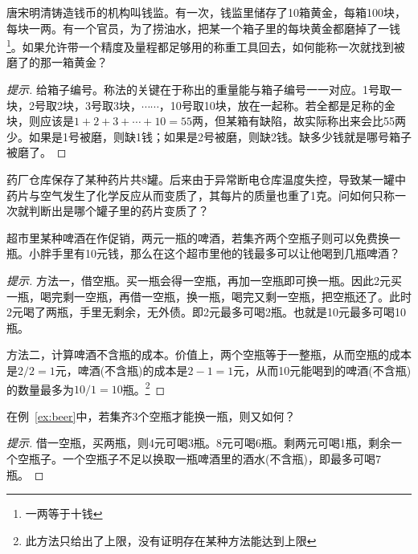 \begin{example}
\renewcommand{\thefootnote}{\fnsymbol{footnote}}%
  唐宋明清铸造钱币的机构叫钱监。有一次，钱监里储存了10箱黄金，每箱100块，每块一两。有一个官员，为了捞油水，把某一个箱子里的每块黄金都磨掉了一钱\footnote{一两等于十钱}。如果允许带一个精度及量程都足够用的称重工具回去，如何能称一次就找到被磨了的那一箱黄金？
\end{example}
\begin{proof}[提示]\let\qed\relax%
  给箱子编号。称法的关键在于称出的重量能与箱子编号一一对应。1号取一块，2号取2块，3号取3块，$\cdots\cdots$，10号取10块，放在一起称。若全都是足称的金块，则应该是$1+2+3+\cdots+10=55$两，但某箱有缺陷，故实际称出来会比55两少。如果是1号被磨，则缺1钱；如果是2号被磨，则缺2钱。缺多少钱就是哪号箱子被磨了。
\end{proof}

\begin{question}
  药厂仓库保存了某种药片共8罐。后来由于异常断电仓库温度失控，导致某一罐中药片与空气发生了化学反应从而变质了，其每片的质量也重了1克。问如何只称一次就判断出是哪个罐子里的药片变质了？
\end{question}

\begin{example}[空瓶换酒]\label{ex:beer}
  超市里某种啤酒在作促销，两元一瓶的啤酒，若集齐两个空瓶子则可以免费换一瓶。小胖手里有10元钱，那么在这个超市里他的钱最多可以让他喝到几瓶啤酒？
\end{example}
\begin{proof}[提示]\renewcommand{\thefootnote}{\fnsymbol{footnote}}%
  方法一，借空瓶。买一瓶会得一空瓶，再加一空瓶即可换一瓶。因此2元买一瓶，喝完剩一空瓶，再借一空瓶，换一瓶，喝完又剩一空瓶，把空瓶还了。此时2元喝了两瓶，手里无剩余，无外债。即2元最多可喝2瓶。也就是10元最多可喝10瓶。

  方法二，计算啤酒不含瓶的成本。价值上，两个空瓶等于一整瓶，从而空瓶的成本是$2/2=1$元，啤酒(不含瓶)的成本是$2-1=1$元，从而10元能喝到的啤酒(不含瓶)的数量最多为$10/1=10$瓶。\footnote{此方法只给出了上限，没有证明存在某种方法能达到上限}
\end{proof}

\begin{question}
  在例~\ref{ex:beer}中，若集齐3个空瓶才能换一瓶，则又如何？
\end{question}
\begin{proof}[提示]
  借一空瓶，买两瓶，则4元可喝3瓶。8元可喝6瓶。剩两元可喝1瓶，剩余一个空瓶子。一个空瓶子不足以换取一瓶啤酒里的酒水(不含瓶)，即最多可喝7瓶。
\end{proof}


